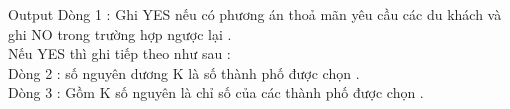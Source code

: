 Output
Dòng 1 : Ghi YES nếu có phương án thoả mãn yêu cầu các du khách và ghi NO trong trường hợp ngược lại .   
\\   Nếu YES thì ghi tiếp theo như sau :   
\\   Dòng 2 : số nguyên dương K là số thành phố được chọn .   
\\   Dòng 3 : Gồm K số nguyên là chỉ số của các thành phố được chọn .